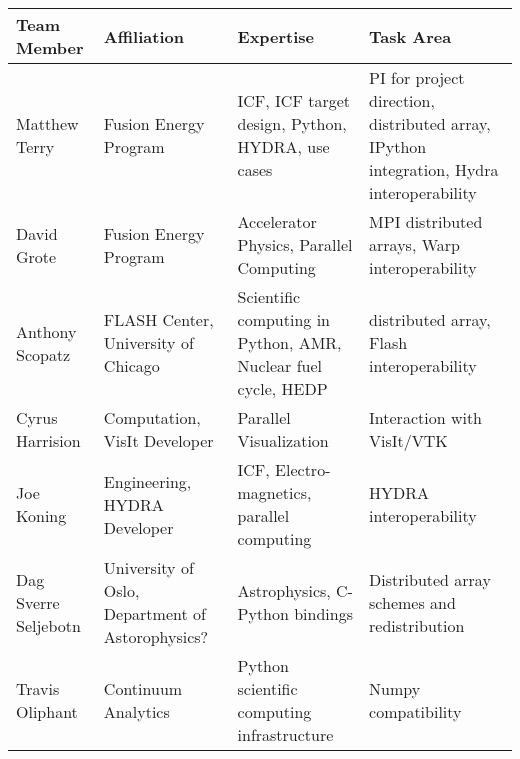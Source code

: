 \documentclass[a4paper]{article}
\newlength{\DUtablewidth} %
\begin{document}
\setlength{\DUtablewidth}{\linewidth}
\begin{longtable*}[c]{|p{0.187\DUtablewidth}|p{0.251\DUtablewidth}|p{0.260\DUtablewidth}|p{0.251\DUtablewidth}|}
	\hline
	\textbf{Team Member} & \textbf{Affiliation} & \textbf{Expertise} & \textbf{Task Area} \\
	\hline
	\endfirsthead
	\hline

	Matthew Terry &
	Fusion Energy Program &
	ICF, ICF target design, Python, HYDRA, use cases &
	PI for project direction, distributed array, IPython integration, Hydra interoperability \\
	\hline

	David Grote &
	Fusion Energy Program &
	Accelerator Physics, Parallel Computing &
	MPI distributed arrays, Warp interoperability \\
	\hline

	Anthony Scopatz &
	FLASH Center, University of Chicago &
	Scientific computing in Python, AMR, Nuclear fuel cycle, HEDP &
	distributed array, Flash interoperability \\
	\hline

	Cyrus Harrision &
	Computation, VisIt Developer &
	Parallel Visualization &
	Interaction with VisIt/VTK  \\
	\hline

	Joe Koning &
	Engineering, HYDRA Developer & 
	ICF, Electro-magnetics, parallel computing & 
	HYDRA interoperability \\
	\hline

	Dag Sverre Seljebotn &
	University of Oslo, Department of Astorophysics? & 
	Astrophysics, C-Python bindings &
	Distributed array schemes and redistribution \\
	\hline

	Travis Oliphant &
	Continuum Analytics &
	Python scientific computing infrastructure &
	Numpy compatibility \\

	\hline
\end{longtable*}



\end{document}

